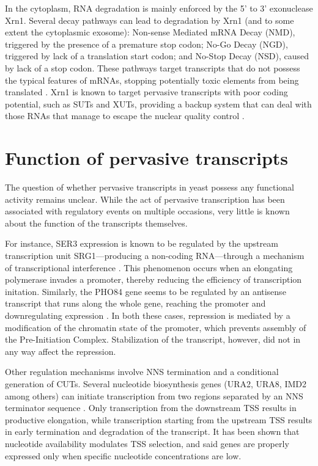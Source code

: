 In the cytoplasm, RNA degradation is mainly enforced by the 5' to 3' exonuclease Xrn1. 
Several decay pathways can lead to degradation by Xrn1 (and to some extent the cytoplasmic exosome): Non-sense Mediated mRNA Decay (NMD), triggered by the presence of a premature stop codon; No-Go Decay (NGD), triggered by lack of a translation start codon; and No-Stop Decay (NSD), caused by lack of a stop codon.
These pathways target transcripts that do not possess the typical features of mRNAs, stopping potentially toxic elements from being translated \cite[for review see][]{houseley:2009:many}. 
Xrn1 is known to target pervasive transcripts with poor coding potential, such as SUTs and XUTs, providing a backup system that can deal with those RNAs that manage to escape the nuclear quality control \cite{malabat:2015:quality}.

\section{Function of pervasive transcripts}

The question of whether pervasive transcripts in yeast possess any functional activity remains unclear.
While the act of pervasive transcription has been associated with regulatory events on multiple occasions, very little is known about the function of the transcripts themselves. 

For instance, SER3 expression is known to be regulated by the upstream transcription unit SRG1—producing a non-coding RNA—through a mechanism of transcriptional interference \cite{martens:2004:intergenic}. 
This phenomenon occurs when an elongating polymerase invades a promoter, thereby reducing the efficiency of transcription initation. Similarly, the PHO84 gene seems to be regulated by an antisense transcript that runs along the whole gene, reaching the promoter and downregulating expression \cite{castelnuovo:2013:bimodal}. 
In both these cases, repression is mediated by a modification of the chromatin state of the promoter, which prevents assembly of the Pre-Initiation Complex. Stabilization of the transcript, however, did not in any way affect the repression.

Other regulation mechanisms involve NNS termination and a conditional generation of CUTs. Several nucleotide biosynthesis genes (URA2, URA8, IMD2 among others) can initiate transcription from two regions separated by an NNS terminator sequence \cite{jenks:2008:properties, thiebaut:2008:futile}. 
Only transcription from the downstream TSS results in productive elongation, while transcription starting from the upstream TSS results in early termination and degradation of the transcript. 
It has been shown that nucleotide availability modulates TSS selection, and said genes are properly expressed only when specific nucleotide concentrations are low.


\clearpage



